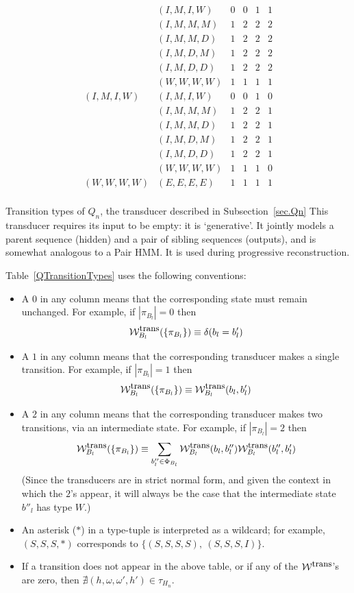 \documentclass{article}
\newcommand{\secref}[1]{Subsection~\ref{sec.#1}}
\newcommand\States{\Phi}
\newcommand\statesof[1]{\States_{#1}}
\newcommand\Transitions{\tau}
\newcommand\transitionsof[1]{\Transitions_{#1}}
\newcommand\weight{{\cal W}}
\newcommand\weightfunof[1]{\weight_{#1}}
\newcommand\transweightfun[1]{\weightfunof{#1}^{\mbox{\small trans}}}
\newcommand\sumoverpaths[1]{\transweightfun{#1}(\{\pi_{#1}\})}
\begin{document}
\begin{table}
\[\begin{array}{ll|cccc}
          & (I,M,I,W) & 0 & 0 & 1 & 1 \\
          & (I,M,M,M) & 1 & 2 & 2 & 2 \\
          & (I,M,M,D) & 1 & 2 & 2 & 2 \\
          & (I,M,D,M) & 1 & 2 & 2 & 2 \\
          & (I,M,D,D) & 1 & 2 & 2 & 2 \\
          & (W,W,W,W) & 1 & 1 & 1 & 1 \\
\hline
(I,M,I,W) & (I,M,I,W) & 0 & 0 & 1 & 0 \\
          & (I,M,M,M) & 1 & 2 & 2 & 1 \\
          & (I,M,M,D) & 1 & 2 & 2 & 1 \\
          & (I,M,D,M) & 1 & 2 & 2 & 1 \\
          & (I,M,D,D) & 1 & 2 & 2 & 1 \\
          & (W,W,W,W) & 1 & 1 & 1 & 0 \\
\hline
(W,W,W,W) & (E,E,E,E) & 1 & 1 & 1 & 1 \\
\end{array}
\]
\caption[]{ \label{QTransitionTypes} Transition types of $Q_n$, the transducer described in  \secref{Qn}
 This transducer requires its input to be empty: it is
 `generative'. It jointly models a parent sequence (hidden) and a pair
 of sibling sequences (outputs), and is somewhat analogous to a Pair 
 HMM. It is used during progressive reconstruction.}
\end{table}
Table~\ref{QTransitionTypes} uses the following conventions:
\begin{itemize}
\item A $0$ in any column means that the corresponding state must remain unchanged.
For example, if $|\pi_{B_l}|=0$ then
\[
\sumoverpaths{B_l} \equiv \delta(b_l=b'_l)
\]
\item A $1$ in any column means that the corresponding transducer makes a single transition.
For example, if $|\pi_{B_l}|=1$ then
\[
\sumoverpaths{B_l} \equiv \transweightfun{B_l}(b_l,b'_l)
\]
\item A $2$ in any column means that the corresponding transducer makes two transitions, via an intermediate state.
For example, if $|\pi_{B_l}|=2$ then
\[
\sumoverpaths{B_l} \equiv \sum_{b''_l \in \statesof{B_l}} \transweightfun{B_l}(b_l,b''_l) \transweightfun{B_l}(b''_l,b'_l)
\]
(Since the transducers are in strict normal form, and given the context in which the $2$'s appear,
it will always be the case that the intermediate state $b''_l$ has type $W$.)
\item An asterisk ($*$) in a type-tuple is interpreted as a wildcard; for example, $(S,S,S,*)$ corresponds to $\{ (S,S,S,S),\ (S,S,S,I) \}$.
\item If a transition does not appear in the above table, or if any of the $\transweightfun{}$'s are zero,
then $\nexists (h,\omega,\omega',h') \in \transitionsof{H_n}$.
\end{itemize}
\end{document}
